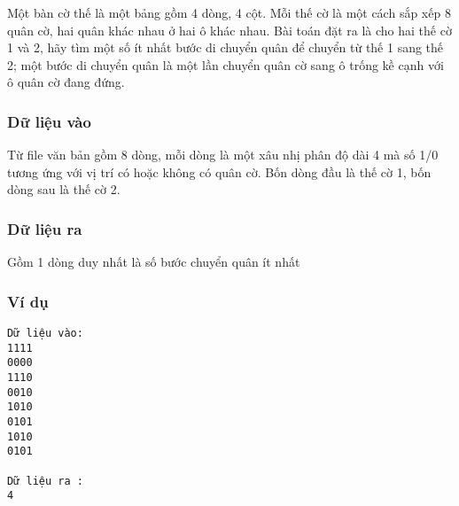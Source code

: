 



   Một bàn cờ thế là một bảng gồm 4 dòng, 4 cột. Mỗi thế cờ là một cách sắp xếp 8 quân cờ, hai quân khác nhau ở hai ô khác nhau.            Bài toán đặt ra là cho hai thế cờ 1 và 2, hãy tìm một số ít nhất bước di chuyển quân để chuyển từ thế 1 sang thế 2; một bước di chuyển quân là một lần chuyển quân cờ sang ô trống kề cạnh với ô quân cờ đang đứng.  

\subsubsection{   Dữ liệu vào  }

   Từ file văn bản gồm 8 dòng, mỗi dòng là một xâu nhị phân độ dài 4 mà số 1/0 tương ứng với vị trí có hoặc không có quân cờ. Bốn dòng đầu là thế cờ 1, bốn dòng sau là thế cờ 2.  

\subsubsection{   Dữ liệu ra  }

   Gồm 1 dòng duy nhất là số bước chuyển quân ít nhất  

\subsubsection{   Ví dụ  }
\begin{verbatim}
Dữ liệu vào:
1111
0000
1110
0010
1010
0101
1010
0101

Dữ liệu ra :
4
\end{verbatim}
